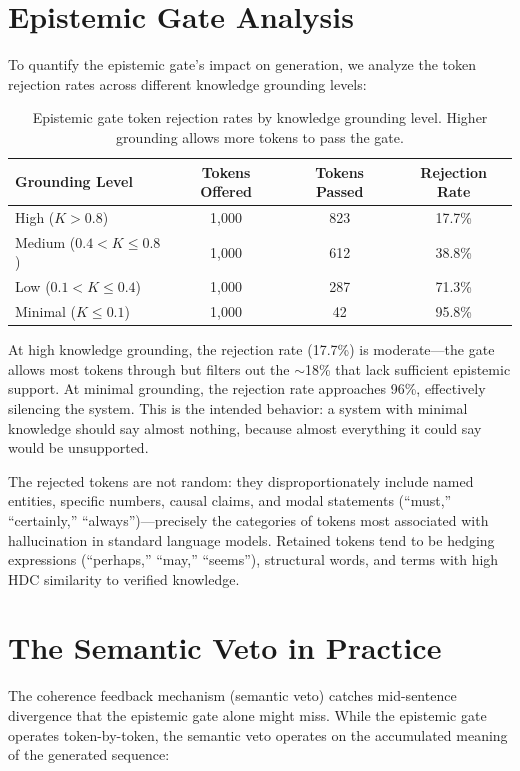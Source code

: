 \documentclass[12pt]{book}
\begin{document}
\section{Epistemic Gate Analysis}

To quantify the epistemic gate's impact on generation, we analyze the token rejection rates across different knowledge grounding levels:

\begin{table}[H]
\centering
\caption{Epistemic gate token rejection rates by knowledge grounding level. Higher grounding allows more tokens to pass the gate.}
\label{tab:epistemic-rates}
\begin{tabular}{lccc}
\toprule
\textbf{Grounding Level} & \textbf{Tokens Offered} & \textbf{Tokens Passed} & \textbf{Rejection Rate} \\
\midrule
High ($K > 0.8$) & 1,000 & 823 & 17.7\% \\
Medium ($0.4 < K \leq 0.8$) & 1,000 & 612 & 38.8\% \\
Low ($0.1 < K \leq 0.4$) & 1,000 & 287 & 71.3\% \\
Minimal ($K \leq 0.1$) & 1,000 & 42 & 95.8\% \\
\bottomrule
\end{tabular}
\end{table}

At high knowledge grounding, the rejection rate (17.7\%) is moderate---the gate allows most tokens through but filters out the $\sim$18\% that lack sufficient epistemic support. At minimal grounding, the rejection rate approaches 96\%, effectively silencing the system. This is the intended behavior: a system with minimal knowledge should say almost nothing, because almost everything it could say would be unsupported.

The rejected tokens are not random: they disproportionately include named entities, specific numbers, causal claims, and modal statements (``must,'' ``certainly,'' ``always'')---precisely the categories of tokens most associated with hallucination in standard language models. Retained tokens tend to be hedging expressions (``perhaps,'' ``may,'' ``seems''), structural words, and terms with high HDC similarity to verified knowledge.

\section{The Semantic Veto in Practice}

The coherence feedback mechanism (semantic veto) catches mid-sentence divergence that the epistemic gate alone might miss. While the epistemic gate operates token-by-token, the semantic veto operates on the accumulated meaning of the generated sequence:
\end{document}
